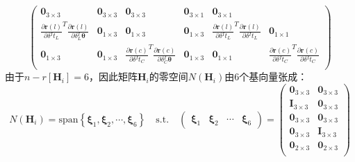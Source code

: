 \begin{equation}
\begin{pmatrix}
    \boldsymbol{0}_{3\times 3}                                                       &
    \boldsymbol{0}_{3\times 3}                                                       &
    \boldsymbol{0}_{3\times 3}                                                       &
    \boldsymbol{0}_{3\times 1}                                                       &
    \boldsymbol{0}_{3\times 1}                                                         \\
    \frac{\partial \boldsymbol{r}(l)}{\partial \delta {^{I}t_{L}}}^T
    \frac{\partial \boldsymbol{r}(l)}{\partial \delta {^{I}_{L}\boldsymbol{\theta}}} &
    \boldsymbol{0}_{1\times 3}                                                       &
    \boldsymbol{0}_{1\times 3}                                                       &
    \boldsymbol{0}_{1\times 3}                                                       &
    \frac{\partial \boldsymbol{r}(l)}{\partial \delta {^{I}t_{L}}}^T
    \frac{\partial \boldsymbol{r}(l)}{\partial \delta {^{I}t_{L}}}                   &
    \boldsymbol{0}_{1\times 1}                                                         \\
    \boldsymbol{0}_{1\times 3}                                                       &
    \boldsymbol{0}_{1\times 3}                                                       &
    \frac{\partial \boldsymbol{r}(c)}{\partial \delta {^{I}t_{C}}}^T
    \frac{\partial \boldsymbol{r}(c)}{\partial \delta {^{I}_{C}\boldsymbol{\theta}}} &
    \boldsymbol{0}_{1\times 3}                                                       &
    \boldsymbol{0}_{1\times 1}                                                       &
    \frac{\partial \boldsymbol{r}(c)}{\partial \delta {^{I}t_{C}}}^T
    \frac{\partial \boldsymbol{r}(c)}{\partial \delta {^{I}t_{C}}}                     \\
  \end{pmatrix}
\end{equation}
由于$n-r\left[ \boldsymbol{H}_i\right] =6$，因此矩阵$\boldsymbol{H}_i$的零空间$N(\boldsymbol{H}_i)$由6个基向量张成：
\begin{equation}
  N(\boldsymbol{H}_i)=\mathrm{span}\left\lbrace
  \boldsymbol{\xi}_1,\boldsymbol{\xi}_2,\cdots,\boldsymbol{\xi}_{6}
  \right\rbrace
  \quad\mathrm{s.t.}\quad
  \begin{pmatrix}
    \boldsymbol{\xi}_1 & \boldsymbol{\xi}_2 & \cdots & \boldsymbol{\xi}_{6}
  \end{pmatrix}=
  \begin{pmatrix}
    \boldsymbol{0}_{3\times 3} & \boldsymbol{0}_{3\times 3} \\
    \boldsymbol{I}_{3\times 3} & \boldsymbol{0}_{3\times 3} \\
    \boldsymbol{0}_{3\times 3} & \boldsymbol{0}_{3\times 3} \\
    \boldsymbol{0}_{3\times 3} & \boldsymbol{I}_{3\times 3} \\
    \boldsymbol{0}_{2\times 3} & \boldsymbol{0}_{2\times 3} \\
  \end{pmatrix}
\end{equation}
